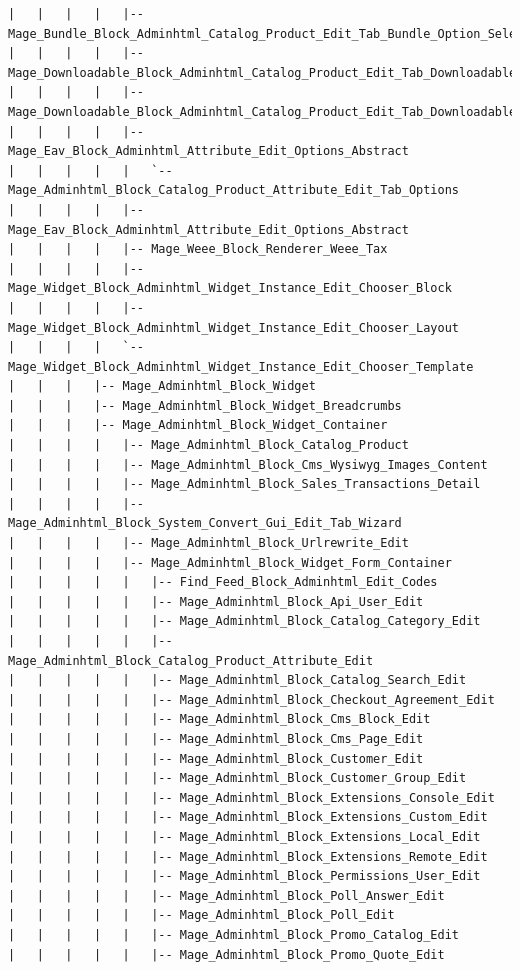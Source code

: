 \documentclass[oneside]{book}
\begin{document}
\begin{lstlisting}
|   |   |   |   |-- Mage_Bundle_Block_Adminhtml_Catalog_Product_Edit_Tab_Bundle_Option_Selection
|   |   |   |   |-- Mage_Downloadable_Block_Adminhtml_Catalog_Product_Edit_Tab_Downloadable
|   |   |   |   |-- Mage_Downloadable_Block_Adminhtml_Catalog_Product_Edit_Tab_Downloadable_Samples
|   |   |   |   |-- Mage_Eav_Block_Adminhtml_Attribute_Edit_Options_Abstract
|   |   |   |   |   `-- Mage_Adminhtml_Block_Catalog_Product_Attribute_Edit_Tab_Options
|   |   |   |   |-- Mage_Eav_Block_Adminhtml_Attribute_Edit_Options_Abstract
|   |   |   |   |-- Mage_Weee_Block_Renderer_Weee_Tax
|   |   |   |   |-- Mage_Widget_Block_Adminhtml_Widget_Instance_Edit_Chooser_Block
|   |   |   |   |-- Mage_Widget_Block_Adminhtml_Widget_Instance_Edit_Chooser_Layout
|   |   |   |   `-- Mage_Widget_Block_Adminhtml_Widget_Instance_Edit_Chooser_Template
|   |   |   |-- Mage_Adminhtml_Block_Widget
|   |   |   |-- Mage_Adminhtml_Block_Widget_Breadcrumbs
|   |   |   |-- Mage_Adminhtml_Block_Widget_Container
|   |   |   |   |-- Mage_Adminhtml_Block_Catalog_Product
|   |   |   |   |-- Mage_Adminhtml_Block_Cms_Wysiwyg_Images_Content
|   |   |   |   |-- Mage_Adminhtml_Block_Sales_Transactions_Detail
|   |   |   |   |-- Mage_Adminhtml_Block_System_Convert_Gui_Edit_Tab_Wizard
|   |   |   |   |-- Mage_Adminhtml_Block_Urlrewrite_Edit
|   |   |   |   |-- Mage_Adminhtml_Block_Widget_Form_Container
|   |   |   |   |   |-- Find_Feed_Block_Adminhtml_Edit_Codes
|   |   |   |   |   |-- Mage_Adminhtml_Block_Api_User_Edit
|   |   |   |   |   |-- Mage_Adminhtml_Block_Catalog_Category_Edit
|   |   |   |   |   |-- Mage_Adminhtml_Block_Catalog_Product_Attribute_Edit
|   |   |   |   |   |-- Mage_Adminhtml_Block_Catalog_Search_Edit
|   |   |   |   |   |-- Mage_Adminhtml_Block_Checkout_Agreement_Edit
|   |   |   |   |   |-- Mage_Adminhtml_Block_Cms_Block_Edit
|   |   |   |   |   |-- Mage_Adminhtml_Block_Cms_Page_Edit
|   |   |   |   |   |-- Mage_Adminhtml_Block_Customer_Edit
|   |   |   |   |   |-- Mage_Adminhtml_Block_Customer_Group_Edit
|   |   |   |   |   |-- Mage_Adminhtml_Block_Extensions_Console_Edit
|   |   |   |   |   |-- Mage_Adminhtml_Block_Extensions_Custom_Edit
|   |   |   |   |   |-- Mage_Adminhtml_Block_Extensions_Local_Edit
|   |   |   |   |   |-- Mage_Adminhtml_Block_Extensions_Remote_Edit
|   |   |   |   |   |-- Mage_Adminhtml_Block_Permissions_User_Edit
|   |   |   |   |   |-- Mage_Adminhtml_Block_Poll_Answer_Edit
|   |   |   |   |   |-- Mage_Adminhtml_Block_Poll_Edit
|   |   |   |   |   |-- Mage_Adminhtml_Block_Promo_Catalog_Edit
|   |   |   |   |   |-- Mage_Adminhtml_Block_Promo_Quote_Edit

\end{lstlisting}
\end{document}
